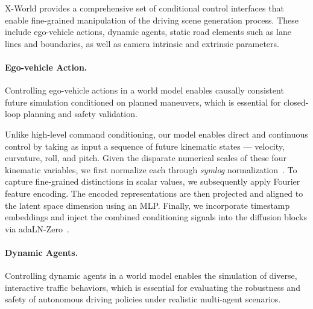 
X-World provides a comprehensive set of conditional control interfaces that enable fine-grained manipulation of the driving scene generation process. 
These include ego-vehicle actions, dynamic agents, static road elements such as lane lines and boundaries, as well as camera intrinsic and extrinsic parameters.


\paragraph{Ego-vehicle Action.}
Controlling ego-vehicle actions in a world model enables causally consistent future simulation conditioned on planned maneuvers, which is essential for closed-loop planning and safety validation. 

Unlike high-level command conditioning, our model enables direct and continuous control by taking as input a sequence of future kinematic states --- velocity, curvature, roll, and pitch. 
Given the disparate numerical scales of these four kinematic variables, we first normalize each through \textit{symlog} normalization~\cite{webber2013bi}. 
To capture fine-grained distinctions in scalar values, we subsequently apply Fourier feature encoding. 
The encoded representations are then projected and aligned to the latent space dimension using an MLP. 
Finally, we incorporate timestamp embeddings and inject the combined conditioning signals into the diffusion blocks via adaLN-Zero~\cite{peebles2023scalable}.

\paragraph{Dynamic Agents.}
Controlling dynamic agents in a world model enables the simulation of diverse, interactive traffic behaviors, which is essential for evaluating the robustness and safety of autonomous driving policies under realistic multi-agent scenarios.

